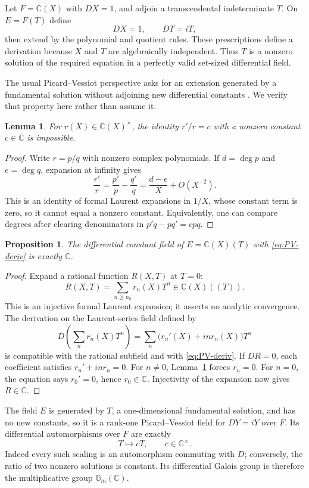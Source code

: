 \documentclass[11pt,a4paper]{article}
\numberwithin{equation}{section}
\newtheorem{proposition}[theorem]{Proposition}
\newtheorem{lemma}[theorem]{Lemma}
\theoremstyle{definition}
\theoremstyle{remark}
\newcommand{\C}{\mathbb C}
\begin{document}
Let $F=\C(X)$ with $DX=1$, and adjoin a transcendental indeterminate $T$.
On $E=F(T)$ define
\begin{equation}\label{eq:PV-deriv}
 DX=1,\qquad DT=iT,
\end{equation}
then extend by the polynomial and quotient rules. These prescriptions define
a derivation because $X$ and $T$ are algebraically independent. Thus $T$ is
a nonzero solution of the required equation in a perfectly valid set-sized
differential field.

The usual Picard--Vessiot perspective asks for an extension generated by a
fundamental solution without adjoining new differential constants
\cite{Singer}. We verify that property here rather than assume it.

\begin{lemma}\label{lem:rational-logder}
For $r(X)\in\C(X)^\times$, the identity $r'/r=c$ with a nonzero constant
$c\in\C$ is impossible.
\end{lemma}
\begin{proof}
Write $r=p/q$ with nonzero complex polynomials. If $d=\deg p$ and
$e=\deg q$, expansion at infinity gives
\[
 \frac{r'}r=\frac{p'}p-\frac{q'}q
 =\frac{d-e}{X}+O(X^{-2}).
\]
This is an identity of formal Laurent expansions in $1/X$, whose constant
term is zero, so it cannot equal a nonzero constant. Equivalently, one can
compare degrees after clearing denominators in
$p'q-pq'=cpq$.
\end{proof}

\begin{proposition}\label{prop:PVconstants}
The differential constant field of $E=\C(X)(T)$ with
\eqref{eq:PV-deriv} is exactly $\C$.
\end{proposition}
\begin{proof}
Expand a rational function $R(X,T)$ at $T=0$:
\[
 R(X,T)=\sum_{n\geq n_0}r_n(X)T^n\in\C(X)((T)).
\]
This is an injective formal Laurent expansion; it asserts no analytic
convergence. The derivation on the Laurent-series field defined by
\[
 D\left(\sum_n r_n(X)T^n\right)
   =\sum_n\bigl(r_n'(X)+in r_n(X)\bigr)T^n
\]
is compatible with the rational subfield and with
\eqref{eq:PV-deriv}. If $DR=0$, each coefficient satisfies
$r_n'+inr_n=0$. For $n\ne0$, Lemma~\ref{lem:rational-logder} forces
$r_n=0$. For $n=0$, the equation says $r_0'=0$, hence $r_0\in\C$.
Injectivity of the expansion now gives $R\in\C$.
\end{proof}

The field $E$ is generated by $T$, a one-dimensional fundamental solution,
and has no new constants, so it is a rank-one Picard--Vessiot field for
$DY=iY$ over $F$. Its differential automorphisms over $F$ are exactly
\[
 T\longmapsto cT,\qquad c\in\C^\times.
\]
Indeed every such scaling is an automorphism commuting with $D$; conversely,
the ratio of two nonzero solutions is constant. Its differential Galois
group is therefore the multiplicative group $\mathbb G_m(\C)$.
\end{document}
